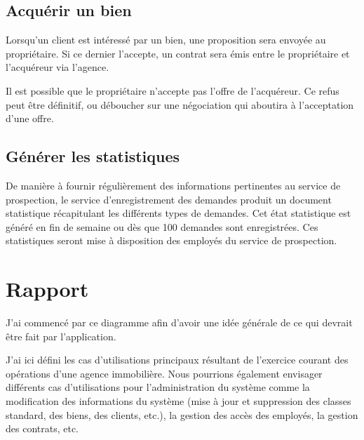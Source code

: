 \subsection{Acquérir un bien}

Lorsqu'un client est intéressé par un bien, une proposition sera envoyée au propriétaire. Si ce dernier l'accepte, un contrat sera émis entre le propriétaire et l'acquéreur via l'agence.

Il est possible que le propriétaire n'accepte pas l'offre de l'acquéreur. Ce refus peut être définitif, ou déboucher sur une négociation qui aboutira à l'acceptation d'une offre.

\subsection{Générer les statistiques}

De manière à fournir régulièrement des informations pertinentes au service de prospection, le service d'enregistrement des demandes produit un document statistique récapitulant les différents types de demandes. Cet état statistique est généré en fin de semaine ou dès que 100 demandes sont enregistrées. Ces statistiques seront mise à disposition des employés du service de prospection.

\section{Rapport}

J'ai commencé par ce diagramme afin d'avoir une idée générale de ce qui devrait être fait par l'application.

J'ai ici défini les cas d'utilisations principaux résultant de l'exercice courant des opérations d'une agence immobilière. Nous pourrions également envisager différents cas d'utilisations pour l'administration du système comme la modification des informations du système (mise à jour et suppression des classes standard, des biens, des clients, etc.), la gestion des accès des employés, la gestion des contrats, etc.

